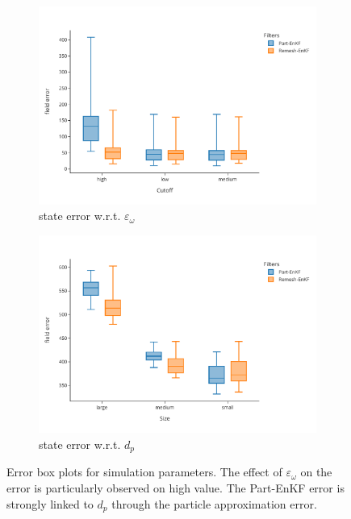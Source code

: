 \begin{figure}[htbp]
	\centering

	\begin{subfigure}{0.48\textwidth}
		\centering
		\includegraphics[width=\linewidth]{./images/app2d/final/MSE_cutoff_box.pdf}
		\captionsetup{labelformat=empty}
		\caption{state error w.r.t. $\varepsilon_{\omega}$}
		\label{fig:eps_omega}
	\end{subfigure}
	\hfill
	\begin{subfigure}{0.48\textwidth}
		\centering
		\includegraphics[width=\linewidth]{./images/app2d/final/MSE_size_box.pdf}
		\captionsetup{labelformat=empty}
		\caption{state error w.r.t. $d_p$}
		\label{fig:np_visc}
	\end{subfigure}

	\caption{Error box plots for simulation parameters. The effect of $\varepsilon_{\omega}$ on the error is particularly observed on high value. The Part-EnKF error is strongly linked to $d_p$ through the particle approximation error.}
	\label{fig:simu_parameters_error}
\end{figure}

